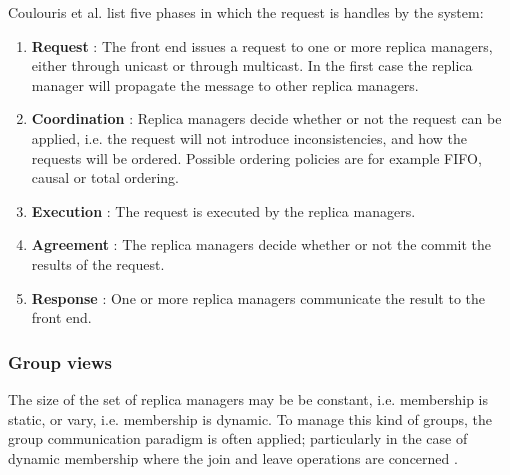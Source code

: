 Coulouris et al. \cite{Coulouris:2011:DSC:2029110} list five phases in which the request is handles by the system:
\begin{enumerate}
	\item \textbf{Request} : The front end issues a request to one or more replica managers, either through unicast or through multicast. In the first case the replica manager will propagate the message to other replica managers.
	\item \textbf{Coordination} : Replica managers decide whether or not the request can be applied, i.e. the request will not introduce inconsistencies, and how the requests will be ordered. Possible ordering policies are for example FIFO, causal or total ordering.
	\item \textbf{Execution} : The request is executed by the replica managers.
	\item \textbf{Agreement} : The replica managers decide whether or not the commit the results of the request.
	\item \textbf{Response} : One or more replica managers communicate the result to the front end.
\end{enumerate}


\subsubsection{Group views}

The size of the set of replica managers may be be constant, i.e. membership is static, or vary, i.e. membership is dynamic. To manage this kind of groups, the group communication paradigm is often applied; particularly in the case of dynamic membership where the join and leave operations are concerned \cite{Coulouris:2011:DSC:2029110}.

